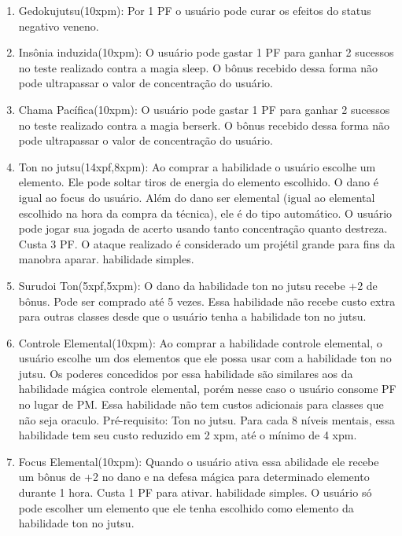 \begin{enumerate}

	\item Gedokujutsu(10xpm): Por 1 PF o usuário pode curar os efeitos do status negativo veneno.

	\item Insônia induzida(10xpm): O usuário pode gastar 1 PF para ganhar 2 sucessos no teste realizado contra a magia sleep. O bônus recebido dessa forma não pode ultrapassar o valor de concentração do usuário.

	\item Chama Pacífica(10xpm): O usuário pode gastar 1 PF para ganhar 2 sucessos no teste realizado contra a magia berserk. O bônus recebido dessa forma não pode ultrapassar o valor de concentração do usuário.

	\item Ton no jutsu(14xpf,8xpm): Ao comprar a habilidade o usuário escolhe um elemento. Ele pode soltar tiros de energia do elemento escolhido. O dano é igual ao focus do usuário. Além do dano ser elemental (igual ao elemental escolhido na hora da compra da técnica), ele é do tipo automático. O usuário pode jogar sua jogada de acerto usando tanto concentração quanto destreza. Custa 3 PF. O ataque realizado é considerado um projétil grande para fins da manobra aparar. habilidade simples. 

	\item Surudoi Ton(5xpf,5xpm):  O dano da habilidade ton no jutsu recebe +2 de bônus. Pode ser comprado até 5 vezes. Essa habilidade não recebe custo extra para outras classes desde que o usuário tenha a habilidade ton no jutsu.

 	\item Controle Elemental(10xpm): Ao comprar a habilidade controle elemental, o usuário escolhe um dos elementos que ele possa usar com a habilidade ton no jutsu. Os poderes concedidos por essa habilidade são similares aos da habilidade mágica controle elemental, porém nesse caso o usuário consome PF no lugar de PM. Essa habilidade não tem custos adicionais para classes que não seja oraculo. Pré-requisito: Ton no jutsu. Para cada 8 níveis mentais, essa habilidade tem seu custo reduzido em 2 xpm, até o mínimo de 4 xpm.

 	\item Focus Elemental(10xpm): Quando o usuário ativa essa abilidade ele recebe um bônus de +2 no dano e na defesa mágica para determinado elemento durante 1 hora. Custa 1 PF para ativar. habilidade simples. O usuário só pode escolher um elemento que ele tenha escolhido como elemento da habilidade ton no jutsu.
 	

\end{enumerate}
